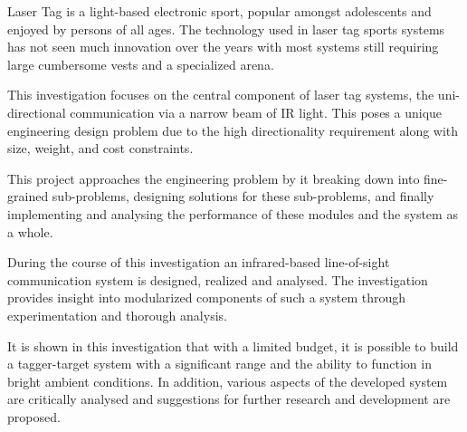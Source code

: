 Laser Tag is a light-based electronic sport, popular amongst adolescents and enjoyed by persons of all ages. The technology used in laser tag sports systems has not seen much innovation over the years with most systems still requiring large cumbersome vests and a specialized arena.

This investigation focuses on the central component of laser tag systems, the uni-directional communication via a narrow beam of IR light. This poses a unique engineering design problem due to the high directionality requirement along with size, weight, and cost constraints.

This project approaches the engineering problem by it breaking down into fine-grained sub-problems, designing solutions for these sub-problems, and finally implementing and analysing the performance of these modules and the system as a whole.

During the course of this investigation an infrared-based line-of-sight communication system is designed, realized and analysed. The investigation provides insight into modularized components of such a system through experimentation and thorough analysis.

It is shown in this investigation that with a limited budget, it is possible to build a tagger-target system with a significant range and the ability to function in bright ambient conditions. In addition, various aspects of the developed system are critically analysed and suggestions for further research and development are proposed.


\iffalse
Your abstract provides a good idea of where the project is going, however, it's missing your key findings and conclusion. An abstract is a highly condensed summary of the entire project and usually follows the following format: intro and problem, project aim, methods, key findings and conclusion.

The abstract is usually the most difficult part to write because of how condensed it needs to be. If you need inspiration, have a look at the abstracts of relevant journal articles :)
\fi